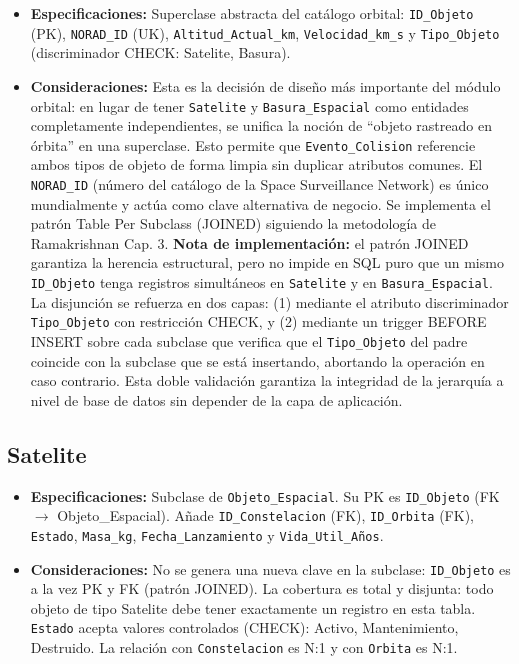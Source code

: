 \begin{itemize}
    \item \textbf{Especificaciones:} Superclase abstracta del catálogo orbital: \texttt{ID\_Objeto} (PK), \texttt{NORAD\_ID} (UK), \texttt{Altitud\_Actual\_km}, \texttt{Velocidad\_km\_s} y \texttt{Tipo\_Objeto} (discriminador CHECK: Satelite, Basura).
    \item \textbf{Consideraciones:} Esta es la decisión de diseño más importante del módulo orbital: en lugar de tener \texttt{Satelite} y \texttt{Basura\_Espacial} como entidades completamente independientes, se unifica la noción de ``objeto rastreado en órbita'' en una superclase. Esto permite que \texttt{Evento\_Colision} referencie ambos tipos de objeto de forma limpia sin duplicar atributos comunes. El \texttt{NORAD\_ID} (número del catálogo de la Space Surveillance Network) es único mundialmente y actúa como clave alternativa de negocio. Se implementa el patrón Table Per Subclass (JOINED) siguiendo la metodología de Ramakrishnan Cap. 3. \textbf{Nota de implementación:} el patrón JOINED garantiza la herencia estructural, pero no impide en SQL puro que un mismo \texttt{ID\_Objeto} tenga registros simultáneos en \texttt{Satelite} y en \texttt{Basura\_Espacial}. La disjunción se refuerza en dos capas: (1) mediante el atributo discriminador \texttt{Tipo\_Objeto} con restricción CHECK, y (2) mediante un trigger BEFORE INSERT sobre cada subclase que verifica que el \texttt{Tipo\_Objeto} del padre coincide con la subclase que se está insertando, abortando la operación en caso contrario. Esta doble validación garantiza la integridad de la jerarquía a nivel de base de datos sin depender de la capa de aplicación.
\end{itemize}

\subsection{Satelite}

\begin{itemize}
    \item \textbf{Especificaciones:} Subclase de \texttt{Objeto\_Espacial}. Su PK es \texttt{ID\_Objeto} (FK $\rightarrow$ Objeto\_Espacial). Añade \texttt{ID\_Constelacion} (FK), \texttt{ID\_Orbita} (FK), \texttt{Estado}, \texttt{Masa\_kg}, \texttt{Fecha\_Lanzamiento} y \texttt{Vida\_Util\_Años}.
    \item \textbf{Consideraciones:} No se genera una nueva clave en la subclase: \texttt{ID\_Objeto} es a la vez PK y FK (patrón JOINED). La cobertura es total y disjunta: todo objeto de tipo Satelite debe tener exactamente un registro en esta tabla. \texttt{Estado} acepta valores controlados (CHECK): Activo, Mantenimiento, Destruido. La relación con \texttt{Constelacion} es N:1 y con \texttt{Orbita} es N:1.
\end{itemize}

